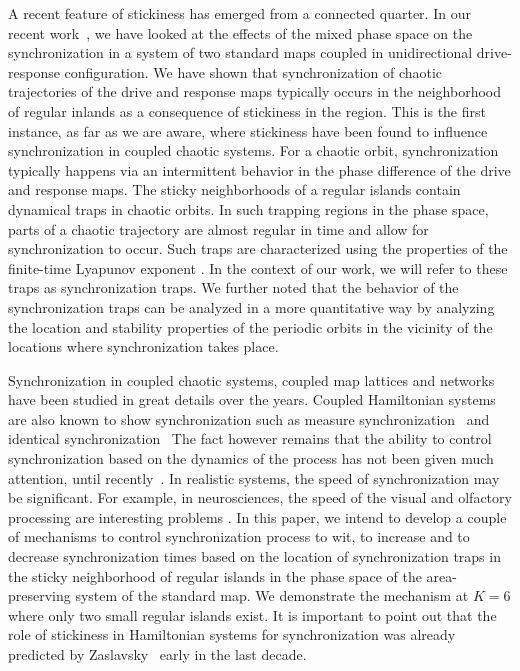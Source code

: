 \documentclass[reprint,superscriptaddress,amsmath,amssymb,aps,pre]{revtex4-1}
\begin{document}
A recent feature of stickiness has emerged from a connected quarter. In our 
recent work~\cite{Mahata2016}, we have looked at the effects of the mixed 
phase space on the synchronization in a system of two standard maps coupled in 
unidirectional drive-response configuration. We have shown that 
synchronization of chaotic trajectories of the drive and response maps 
typically occurs in the neighborhood of regular inlands as a consequence of 
stickiness in the region.  This is the first instance, as far as we are aware, 
where stickiness have been found to influence synchronization in coupled 
chaotic systems.  For a chaotic orbit, synchronization typically happens via 
an intermittent behavior in the phase difference of the drive and response 
maps.   The sticky neighborhoods of a regular islands contain dynamical traps 
in chaotic orbits. In such trapping regions in the phase space, parts of a 
chaotic trajectory are almost regular in time and allow for synchronization to 
occur. Such traps are characterized using the properties of the finite-time 
Lyapunov exponent \cite{Szezech2005}. In the context of our work, we will 
refer to these traps as synchronization traps. We further noted that the 
behavior of the synchronization traps can be analyzed in a more quantitative 
way by analyzing the location and stability properties of the periodic orbits 
in the vicinity of the locations where synchronization takes place.

Synchronization in coupled chaotic systems, coupled map lattices and networks 
have been studied in great details over the years. Coupled Hamiltonian systems are also known to show synchronization such as measure synchronization~\cite{Hampton1999,Wang2003,Vincent2005,Gupta2017} and identical synchronization~\cite{Mahata2016,Das2017} The fact however remains 
that the ability to control synchronization based on the dynamics of the 
process has not been given much attention, until 
recently~\cite{Grabow2011,Wang2016}. In realistic systems, the speed of 
synchronization may be significant. For example, in
neurosciences,  the speed of the visual and olfactory processing are 
interesting problems \cite{Thorpe1996,Uchida2003}. In this paper, we intend 
to develop a couple of 
mechanisms to control synchronization process to wit,  to increase and to 
decrease synchronization times based on the location of synchronization traps 
in the sticky neighborhood of regular islands in the phase space of the 
area-preserving system of the standard map. We demonstrate the mechanism at $K 
= 6$ where only two small regular islands exist. It is important to point out 
that the role of stickiness in Hamiltonian systems for synchronization was 
already predicted by Zaslavsky~\cite{Zaslavsky2002b} early in the last decade.
\end{document}
